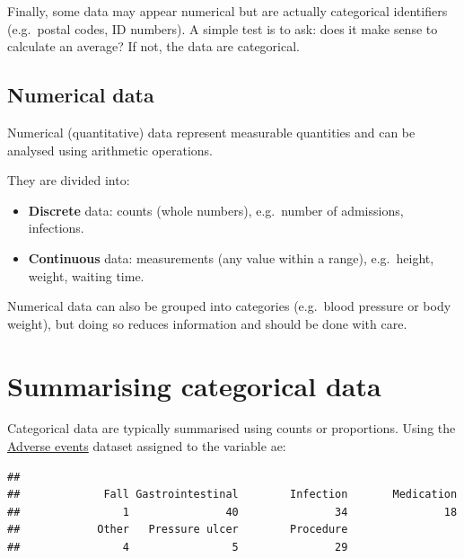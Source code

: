 \documentclass[
]{book}
\newenvironment{Shaded}{\begin{snugshade}}{\end{snugshade}}
\newcommand{\CommentTok}[1]{\textcolor[rgb]{0.56,0.35,0.01}{\textit{#1}}}
\newcommand{\FunctionTok}[1]{\textcolor[rgb]{0.13,0.29,0.53}{\textbf{#1}}}
\newcommand{\NormalTok}[1]{#1}
\newcommand{\OtherTok}[1]{\textcolor[rgb]{0.56,0.35,0.01}{#1}}
\newcommand{\SpecialCharTok}[1]{\textcolor[rgb]{0.81,0.36,0.00}{\textbf{#1}}}
\providecommand{\tightlist}{%
  \setlength{\itemsep}{0pt}\setlength{\parskip}{0pt}}
\begin{document}
Finally, some data may appear numerical but are actually categorical identifiers (e.g.~postal codes, ID numbers). A simple test is to ask: does it make sense to calculate an average? If not, the data are categorical.

\subsection{Numerical data}\label{numerical-data}

Numerical (quantitative) data represent measurable quantities and can be analysed using arithmetic operations.

They are divided into:

\begin{itemize}
\tightlist
\item
  \textbf{Discrete} data: counts (whole numbers), e.g.~number of admissions, infections.
\item
  \textbf{Continuous} data: measurements (any value within a range), e.g.~height, weight, waiting time.
\end{itemize}

Numerical data can also be grouped into categories (e.g.~blood pressure or body weight), but doing so reduces information and should be done with care.

\section{Summarising categorical data}\label{summarising-categorical-data}

Categorical data are typically summarised using counts or proportions.
Using the \hyperref[adverse-events]{Adverse events} dataset assigned to the variable ae:

\begin{Shaded}
\end{Shaded}

\begin{verbatim}
## 
##             Fall Gastrointestinal        Infection       Medication 
##                1               40               34               18 
##            Other   Pressure ulcer        Procedure 
##                4                5               29
\end{verbatim}
\end{document}
